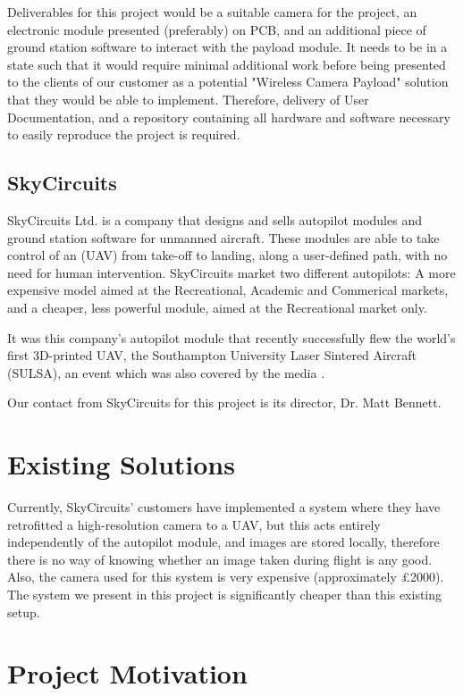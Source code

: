 Deliverables for this project would be a suitable camera for the project, 
an electronic module presented (preferably) on PCB, and an additional 
piece of ground station software to interact with the payload module. It 
needs to be in a state such that it would require minimal additional work 
before being presented to the clients of our customer as a potential "Wireless Camera Payload" solution that they would be able to implement. 
Therefore, delivery of User Documentation, and a repository containing all 
hardware and software necessary to easily reproduce the project is required.

\subsection{SkyCircuits}

SkyCircuits Ltd. \cite{SkyCircuits} is a company that designs and sells 
autopilot modules and ground station software for unmanned aircraft. These 
modules are able to take control of an (UAV) from take-off to landing, 
along a user-defined path, with no need for human intervention. SkyCircuits 
market two different autopilots: A more expensive model aimed at the 
Recreational, Academic and Commerical markets, and a cheaper, less powerful 
module, aimed at the Recreational market only.

It was this company's autopilot module that recently successfully flew the 
world's first 3D-printed UAV, the Southampton University Laser Sintered 
Aircraft (SULSA), \cite{SULSA} an event which was also covered by the 
media \cite{SC_Press}.

Our contact from SkyCircuits for this project is its director, Dr. Matt 
Bennett.

\section{Existing Solutions}
\label{sec:existing_soln}

Currently, SkyCircuits' customers have implemented a system where they have 
retrofitted a high-resolution camera to a UAV, but this acts entirely 
independently of the autopilot module, and images are stored locally, 
therefore there is no way of knowing whether an image taken during flight 
is any good. Also, the camera used for this system is very expensive 
(approximately \pounds 2000). The system we present in this project is 
significantly cheaper than this existing setup.

\section{Project Motivation}

